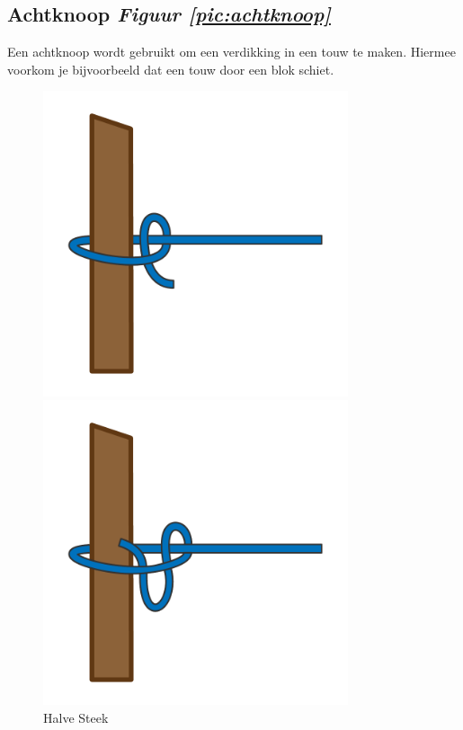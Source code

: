 \subsection{Achtknoop \hfill \textit{Figuur \ref{pic:achtknoop}}}
Een achtknoop wordt gebruikt om een verdikking in een touw te maken. Hiermee voorkom je bijvoorbeeld dat een touw door een blok schiet. 
\begin{figure}[h]
  \centering
  \begin{minipage}[b]{0.32\textwidth}
  \centering
    \includegraphics[width=0.8\textwidth]{Hoofdstukken/Schiemannen/pdf/halve_steek.pdf}
    \caption{Halve Steek}
    \label{pic:halve_steek}
  \end{minipage}
  \hfill
  \begin{minipage}[b]{0.32\textwidth}
    \centering
    \includegraphics[width=0.8\textwidth]{Hoofdstukken/Schiemannen/pdf/slip_steek.pdf}

\end{minipage}
\end{figure}
